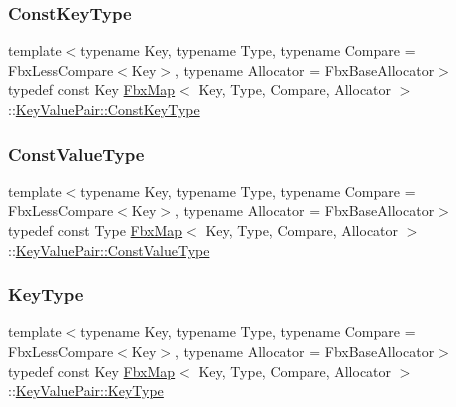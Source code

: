 \subsubsection{\texorpdfstring{Const\+Key\+Type}{ConstKeyType}}
{\footnotesize\ttfamily template$<$typename Key, typename Type, typename Compare = Fbx\+Less\+Compare$<$\+Key$>$, typename Allocator = Fbx\+Base\+Allocator$>$ \\
typedef const Key \hyperlink{class_fbx_map}{Fbx\+Map}$<$ Key, Type, Compare, Allocator $>$\+::\hyperlink{class_fbx_map_1_1_key_value_pair_a74738485dc0b74e76e09dfbcdca9e62e}{Key\+Value\+Pair\+::\+Const\+Key\+Type}}

\mbox{\label{class_fbx_map_1_1_key_value_pair_a13d0030dcec9979f30273cc4ac6ed871}} 
\subsubsection{\texorpdfstring{Const\+Value\+Type}{ConstValueType}}
{\footnotesize\ttfamily template$<$typename Key, typename Type, typename Compare = Fbx\+Less\+Compare$<$\+Key$>$, typename Allocator = Fbx\+Base\+Allocator$>$ \\
typedef const Type \hyperlink{class_fbx_map}{Fbx\+Map}$<$ Key, Type, Compare, Allocator $>$\+::\hyperlink{class_fbx_map_1_1_key_value_pair_a13d0030dcec9979f30273cc4ac6ed871}{Key\+Value\+Pair\+::\+Const\+Value\+Type}}

\mbox{\label{class_fbx_map_1_1_key_value_pair_a5e685c6ff77cdf31f878e5105737c1a3}} 
\subsubsection{\texorpdfstring{Key\+Type}{KeyType}}
{\footnotesize\ttfamily template$<$typename Key, typename Type, typename Compare = Fbx\+Less\+Compare$<$\+Key$>$, typename Allocator = Fbx\+Base\+Allocator$>$ \\
typedef const Key \hyperlink{class_fbx_map}{Fbx\+Map}$<$ Key, Type, Compare, Allocator $>$\+::\hyperlink{class_fbx_map_1_1_key_value_pair_a5e685c6ff77cdf31f878e5105737c1a3}{Key\+Value\+Pair\+::\+Key\+Type}}

